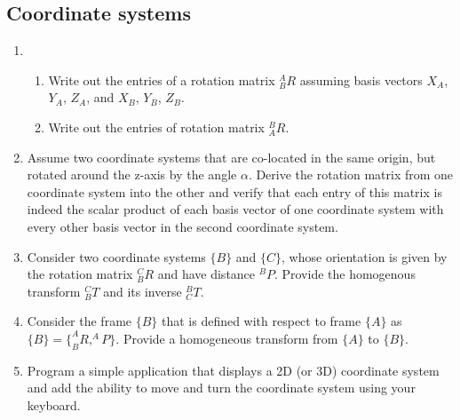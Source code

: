 \subsection*{Coordinate systems}
\begin{enumerate}
\item
\begin{enumerate}
 \item Write out the entries of a rotation matrix $^A_BR$ assuming basis vectors $X_A$, $Y_A$, $Z_A$, and $X_B$, $Y_B$, $Z_B$.
 \item Write out the entries of rotation matrix $^B_AR$.
 \end{enumerate}
\item Assume two coordinate systems that are co-located in the same origin, but rotated around the z-axis by the angle $\alpha$. Derive the rotation matrix from one coordinate system into the other and verify that each entry of this matrix is indeed the scalar product of each basis vector of one coordinate system with every other basis vector in the second coordinate system.
\item Consider two coordinate systems $\{B\}$ and $\{C\}$, whose orientation is given by the rotation matrix $^C_BR$ and have distance $^BP$. Provide the homogenous transform $^C_BT$ and its inverse $^B_CT$.
\item Consider the frame $\{B\}$ that is defined with respect to frame $\{A\}$ as $\{B\}=\{^A_BR, ^AP\}$. Provide a homogeneous transform from $\{A\}$ to $\{B\}$.
\item Program a simple application that displays a 2D (or 3D) coordinate system and add the ability to move and turn the coordinate system using your keyboard.
\end{enumerate}

